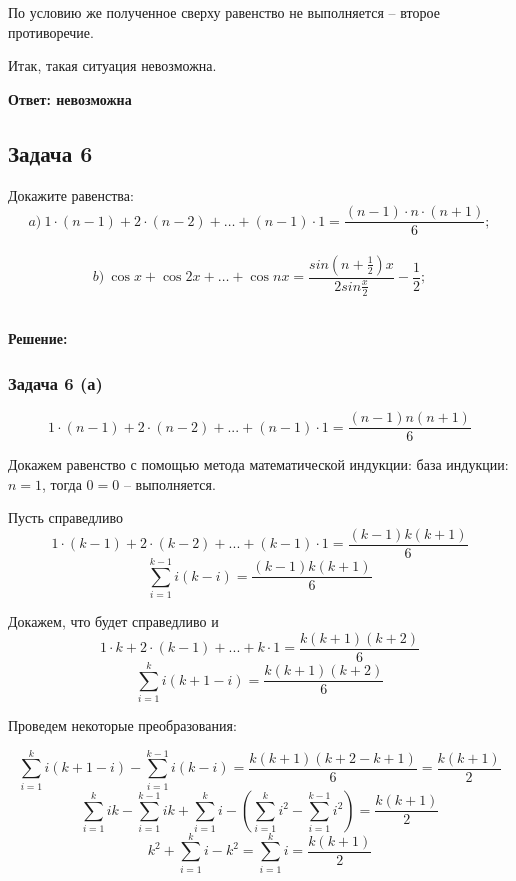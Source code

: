 \documentclass[a4paper,14pt]{article} %
\begin{document}
По условию же полученное сверху равенство не выполняется -- второе противоречие.

Итак, такая ситуация невозможна.
\begin{flushright}
\begin{large}
\textbf {Ответ: невозможна}
\end{large}
\end{flushright} 

\newpage
\begin{center}
\subsection{Задача 6}
\end{center}

Докажите равенства:\\
\[a)\ 1 \cdot(n - 1) + 2 \cdot (n - 2) + \dots + (n - 1) \cdot 1 = \frac{(n-1)\cdot n\cdot (n+1)}{6};\]\\
\[b)\  \cos{x} + \cos2x + \dots + \cos{nx} = \frac{sin(n+\frac{1}{2})x}{2sin\frac{x}{2}} - \frac{1}{2};\]\\
\newpage
\begin{center}
\bfseries
{\Large Решение: }
\end{center}


\subsubsection{Задача 6 (а)}

\[1 \cdot (n-1) + 2 \cdot (n-2) + ... + (n-1) \cdot 1 = \frac{(n-1)n(n+1)}{6} \]

Докажем равенство с помощью метода математической индукции: база индукции: $n = 1$, тогда $0 = 0$ -- выполняется.

Пусть справедливо
\[1 \cdot (k-1) + 2 \cdot (k-2) + ... + (k-1) \cdot 1 = \frac{(k-1)k(k+1)}{6} \]
\[\sum\limits_{i=1}^{k-1} i(k-i) = \frac{(k-1)k(k+1)}{6}\]

Докажем, что будет справедливо и
\[1 \cdot k + 2 \cdot (k-1) + ... + k \cdot 1 = \frac{k(k+1)(k+2)}{6} \]
\[\sum\limits_{i=1}^{k} i(k+1-i) = \frac{k(k+1)(k+2)}{6} \]

Проведем некоторые преобразования:

\[\sum\limits_{i=1}^{k} i(k+1-i) - \sum\limits_{i=1}^{k-1} i(k-i) = \frac{k(k+1)(k+2-k + 1)}{6} = \frac{k(k+1)}{2} \]
\[\sum\limits_{i=1}^{k} ik - \sum\limits_{i=1}^{k-1} ik + \sum\limits_{i=1}^{k}i - (\sum\limits_{i=1}^{k} i^2 - \sum\limits_{i=1}^{k-1} i^2) = \frac{k(k+1)}{2}\]
\[k^2 + \sum\limits_{i=1}^{k}i - k^2 =\sum\limits_{i=1}^{k}i =  \frac{k(k+1)}{2}\]
\end{document}
